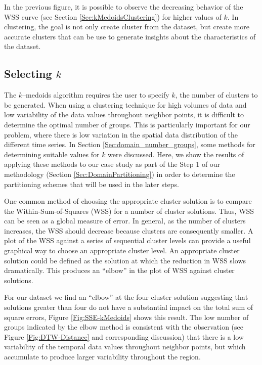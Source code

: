 In the previous figure, it is possible to observe the decreasing behavior of the WSS curve (see Section \ref{Sec:kMedoidsClustering}) for higher values of $k$. In clustering, the goal is not only create cluster from the dataset, but create more accurate clusters that can be use to generate insights about the characteristics of the dataset.

\subsection{Selecting $k$}
\label{Sec:Selectk}

The $k$--medoids algorithm requires the user to specify $k$, the number of clusters to be generated. When using a clustering technique for high volumes of data and low variability of the data values throughout neighbor points, it is difficult to determine the optimal number of groups. This is particularly important for our problem, where there is low variation in the spatial data distribution of the different time series. In Section \ref{Sec:domain_number_groups}, some methods for determining suitable values for $k$ were discussed. Here, we show the results of applying these methods to our case study as part of the Step 1 of our methodology (Section \ref{Sec:DomainPartitioning}) in order to determine the partitioning schemes that will be used in the later steps.

One common method of choosing the appropriate cluster solution is to compare the Within-Sum-of-Squares (WSS) for a number of cluster solutions. Thus, WSS can be seen as a global measure of error. In general, as the number of clusters increases, the WSS should decrease because clusters are consequently smaller. A plot of the WSS against a series of sequential cluster levels can provide a useful graphical way to choose an appropriate cluster level. An appropriate cluster solution could be defined as the solution at which the reduction in WSS slows dramatically. This produces an ``elbow'' in the plot of WSS against cluster solutions. 

For our dataset we find an ``elbow'' at the four cluster solution suggesting that solutions greater than four do not have a substantial impact on the total sum of square errors, Figure \ref{Fig:SSE-kMedoids} shows this result. The low number of groups indicated by the elbow method is consistent with the observation (see Figure \ref{Fig:DTW-Distance} and corresponding discussion) that there is a low variability of the temporal data values throughout neighbor points, but which accumulate to produce larger variability throughout the region.

